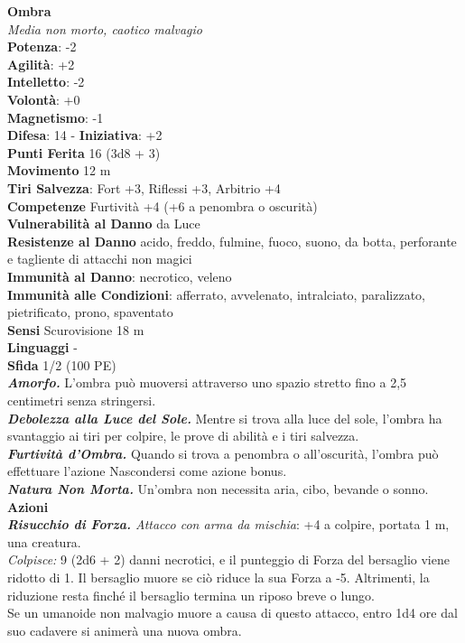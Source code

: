 \begin{multicols}{2}
\medskip\textbf{Ombra}\\
\emph{Media non morto, caotico malvagio}\\
\textbf{Potenza}: -2\\
\textbf{Agilità}: +2\\
\textbf{Intelletto}: -2\\
\textbf{Volontà}: +0\\
\textbf{Magnetismo}: -1\\
\textbf{Difesa}: 14 - \textbf{Iniziativa}: +2\\
\textbf{Punti Ferita} 16 (3d8 + 3)\\
\textbf{Movimento} 12 m\\
\textbf{Tiri Salvezza}: Fort +3, Riflessi +3, Arbitrio +4\\
\textbf{Competenze} Furtività +4 (+6 a penombra o oscurità)\\
\textbf{Vulnerabilità al Danno} da Luce\\
\textbf{Resistenze al Danno} acido, freddo, fulmine, fuoco, suono, da botta, perforante e tagliente di attacchi non magici\\
\textbf{Immunità al Danno}: necrotico, veleno\\
\textbf{Immunità alle Condizioni}: afferrato, avvelenato, intralciato, paralizzato, pietrificato, prono, spaventato\\
\textbf{Sensi} Scurovisione 18 m\\
\textbf{Linguaggi} -\\
\textbf{Sfida} 1/2 (100 PE)\smallskip\\
\emph{\textbf{Amorfo.}} L'ombra può muoversi attraverso uno spazio stretto fino a 2,5 centimetri senza stringersi. \\
\emph{\textbf{Debolezza alla Luce del Sole.}} Mentre si trova alla luce del sole, l'ombra ha svantaggio ai tiri per colpire, le prove di abilità e i tiri salvezza.\\
\emph{\textbf{Furtività d'Ombra.}} Quando si trova a penombra o all'oscurità, l'ombra può effettuare l'azione Nascondersi come azione bonus.\\
\emph{\textbf{Natura Non Morta.}} Un'ombra non necessita aria, cibo, bevande o sonno.\\
\smallskip\textbf{Azioni}\\
\emph{\textbf{Risucchio di Forza.} Attacco con arma da mischia}: +4 a colpire, portata 1 m, una creatura.\\
\emph{Colpisce:} 9 (2d6 + 2) danni necrotici, e il punteggio di Forza del bersaglio viene ridotto di 1.  Il bersaglio muore se ciò riduce la sua Forza a -5. Altrimenti, la riduzione resta finché il bersaglio termina un riposo breve o lungo.\\
Se un umanoide non malvagio muore a causa di questo attacco, entro 1d4 ore dal suo cadavere si animerà una nuova ombra.\\


\end{multicols}
